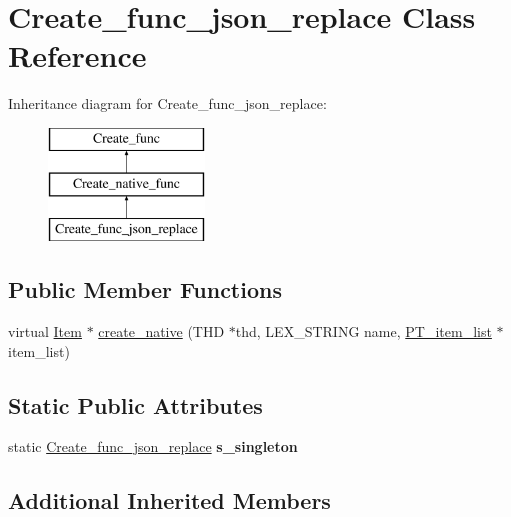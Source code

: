 \hypertarget{classCreate__func__json__replace}{}\section{Create\+\_\+func\+\_\+json\+\_\+replace Class Reference}
\label{classCreate__func__json__replace}
Inheritance diagram for Create\+\_\+func\+\_\+json\+\_\+replace\+:\begin{figure}[H]
\begin{center}
\leavevmode
\includegraphics[height=3.000000cm]{classCreate__func__json__replace}
\end{center}
\end{figure}
\subsection*{Public Member Functions}
\begin{DoxyCompactItemize}
\item 
virtual \mbox{\hyperlink{classItem}{Item}} $\ast$ \mbox{\hyperlink{classCreate__func__json__replace_aed59696780378d09108bf96b66f11b7b}{create\+\_\+native}} (T\+HD $\ast$thd, L\+E\+X\+\_\+\+S\+T\+R\+I\+NG name, \mbox{\hyperlink{classPT__item__list}{P\+T\+\_\+item\+\_\+list}} $\ast$item\+\_\+list)
\end{DoxyCompactItemize}
\subsection*{Static Public Attributes}
\begin{DoxyCompactItemize}
\item 
\mbox{\label{classCreate__func__json__replace_a0e5bec88095c40ce91fdc1d5fbe2a7df}} 
static \mbox{\hyperlink{classCreate__func__json__replace}{Create\+\_\+func\+\_\+json\+\_\+replace}} {\bfseries s\+\_\+singleton}
\end{DoxyCompactItemize}
\subsection*{Additional Inherited Members}


